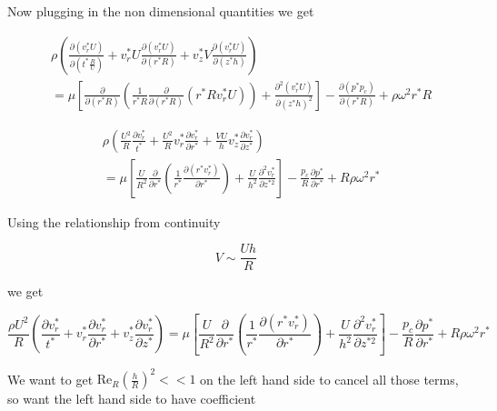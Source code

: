 Now plugging in the non dimensional quantities we get

\begin{equation*}
  \begin{split}
    &\rho\left(\frac{\partial(v_{r}^{*}U)}{\partial(t^{*}\frac{R}{U})}+v_{r}^{*}U\frac{\partial(v_{r}^{*}U)}{\partial(r^{*}R)}+v_{z}^{*}V\frac{\partial(v_{r}^{*}U)}{\partial(z^{*}h)}\right)\\
    &=\mu\left[\frac{\partial}{\partial(r^{*}R)}\left(\frac{1}{r^{*}R}\frac{\partial}{\partial(r^{*}R)}(r^{*}Rv_{r}^{*}U)\right)+\frac{\partial^{2}(v_{r}^{*}U)}{\partial(z^{*}h)^{2}}\right]-\frac{\partial(p^{*}p_{c})}{\partial(r^{*}R)}+\rho\omega^{2}r^{*}R
  \end{split}
\end{equation*}

\begin{equation*}
  \begin{split}
    &\rho\left(\frac{U^{2}}{R}\frac{\partial{}v_{r}^{*}}{t^{*}}+\frac{U^{2}}{R}v_{r}^{*}\frac{\partial{}v_{r}^{*}}{\partial{}r^{*}}+\frac{VU}{h}v_{z}^{*}\frac{\partial{}v_{r}^{*}}{\partial{}z^{*}}\right) \\
    &=\mu\left[\frac{U}{R^{2}}\frac{\partial}{\partial{}r^{*}}\left(\frac{1}{r^{*}}\frac{\partial(r^{*}v_{r}^{*})}{\partial{}r^{*}}\right)+\frac{U}{h^{2}}\frac{\partial^{2}v_{r}^{*}}{\partial{}z^{*2}}\right]-\frac{p_{c}}{R}\frac{\partial{}p^{*}}{\partial{}r^{*}}+R\rho\omega^{2}r^{*}
  \end{split}
\end{equation*}

Using the relationship from continuity

\begin{equation*}
  V\sim\frac{Uh}{R}
\end{equation*}

we get

\begin{equation*}
  \frac{\rho{}U^{2}}{R}\left(\frac{\partial{}v_{r}^{*}}{t^{*}}+v_{r}^{*}\frac{\partial{}v_{r}^{*}}{\partial{}r^{*}}+v_{z}^{*}\frac{\partial{}v_{r}^{*}}{\partial{}z^{*}}\right)=\mu\left[\frac{U}{R^{2}}\frac{\partial}{\partial{}r^{*}}\left(\frac{1}{r^{*}}\frac{\partial(r^{*}v_{r}^{*})}{\partial{}r^{*}}\right)+\frac{U}{h^{2}}\frac{\partial^{2}v_{r}^{*}}{\partial{}z^{*2}}\right]-\frac{p_{c}}{R}\frac{\partial{}p^{*}}{\partial{}r^{*}}+R\rho\omega^{2}r^{*}
\end{equation*}

We want to get $\text{Re}_{R}\left(\frac{h}{R}\right)^{2}<<1$ on the left hand side to cancel all those terms, so want the left hand side to have coefficient

